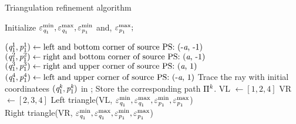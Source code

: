 \begin{algorithm}
\caption{Triangulation refinement algorithm}\label{alg:triangulation}
Initialize $\varepsilon_{\textit{q}_1}^{\textrm{min}}, \varepsilon_{\textit{q}_1}^{\textrm{max}}, \varepsilon_{\textit{p}_1}^{\textrm{min}}$ and,
 $\varepsilon_{\textit{p}_1}^{\textrm{max}};$
\begin{algorithmic}[1]
\State $(\textit{q}_1^1, \textit{p}_1^1)\gets \mbox{left and bottom corner of source PS: (-\textit{a}, -1)}$
\State $(\textit{q}_1^2, \textit{p}_1^2) \gets \mbox{right and bottom corner of source PS:  (\textit{a}, -1)}$
\State $(\textit{q}_1^3, \textit{p}_1^3)  \gets \mbox{right and upper corner of source PS: (\textit{a}, 1)}$
\State $(\textit{q}_1^4, \textit{p}_1^4) \gets \mbox{left and upper corner of source PS: (-\textit{a}, 1)} $
\State Trace the ray with initial coordinatees $(\textit{q}_1^{\textit{k}}, \textit{p}_1^{\textit{k}})$ in ;
\State Store the corresponding path $\Pi^{\textit{k}}$.
\EndFor
\State VL $\gets [1, 2, 4]$ 
\State VR $\gets [2,3, 4]$   
\State Left triangle(VL, $\varepsilon_{\textit{q}_1}^{\textrm{min}}, \varepsilon_{\textit{q}_1}^{\textrm{max}}, \varepsilon_{\textit{p}_1}^{\textrm{min}}, \varepsilon_{\textit{p}_1}^{\textrm{max}}$)  \\
\State Right triangle(VR, $\varepsilon_{\textit{q}_1}^{\textrm{min}}, \varepsilon_{\textit{q}_1}^{\textrm{max}}, \varepsilon_{\textit{p}_1}^{\textrm{min}}, \varepsilon_{\textit{p}_1}^{\textrm{max}}$)  \\
\end{algorithmic}
\end{algorithm}
